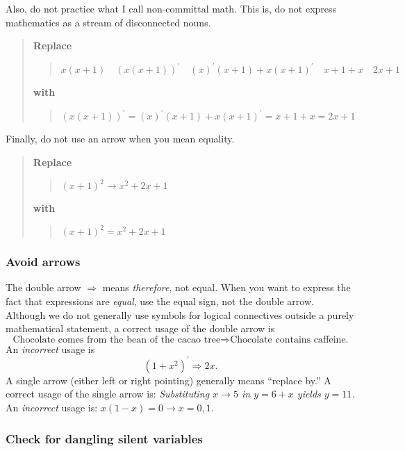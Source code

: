 \documentclass[12pt,fleqn]{article}
\newcounter{ex}\setcounter{ex}{0}
\newcounter{id}\setcounter{id}{0}
\newcounter{se}\setcounter{se}{0}
\begin{document}
\noindent Also, do not practice what I call non-committal math. This is, do not
express mathematics as a stream of disconnected nouns.

\begin{quote}
\textbf{Replace}
\begin{quote}
  \( x (x + 1) \quad (x (x + 1))^\prime \quad (x)^\prime (x + 1) + x (x+1)^\prime
 \quad x + 1 + x \quad 2x + 1 \)
\end{quote}
\textbf{with}
\begin{quote}
   \((x (x + 1))^\prime = (x)^\prime (x + 1) + x (x+1)^\prime =  x + 1 + x = 2x + 1 \)
\end{quote}
\end{quote}

Finally, do not use an arrow when you mean equality.

\begin{quote}
\textbf{Replace}
\begin{quote}
  \( (x+1)^2 \rightarrow x^2 + 2 x + 1 \)
\end{quote}
\textbf{with}
\begin{quote}
   \( (x+1)^2 = x^2 + 2 x + 1 \)
\end{quote}
\end{quote}

 \subsubsection{ Avoid arrows}
The double arrow \(\Rightarrow\) means \emph{therefore}, not
equal. When you want to express the fact that expressions are
\emph{equal}, use the equal sign, not the double arrow. Although we do
not generally use symbols for logical connectives outside a purely
mathematical statement, a correct usage of
the double arrow is
\begin{equation*}
  \mbox{Chocolate comes from the bean of the
cacao tree} \Rightarrow  \mbox{Chocolate contains caffeine.} 
\end{equation*}
 An \emph{incorrect} usage is
 \begin{equation*}
  \left(1 + x^2\right)^\prime \Rightarrow 2 x. 
 \end{equation*}
A single arrow (either left or right pointing) generally means
``replace by.''  A correct usage of the single arrow is:
\emph{Substituting \(x \to 5\) in \(y = 6 + x\) yields \(y = 11\).} An
\emph{incorrect} usage is: \(x (1-x) = 0 \to x = 0,1\).



 \subsubsection{ Check for dangling silent variables}
\end{document}
